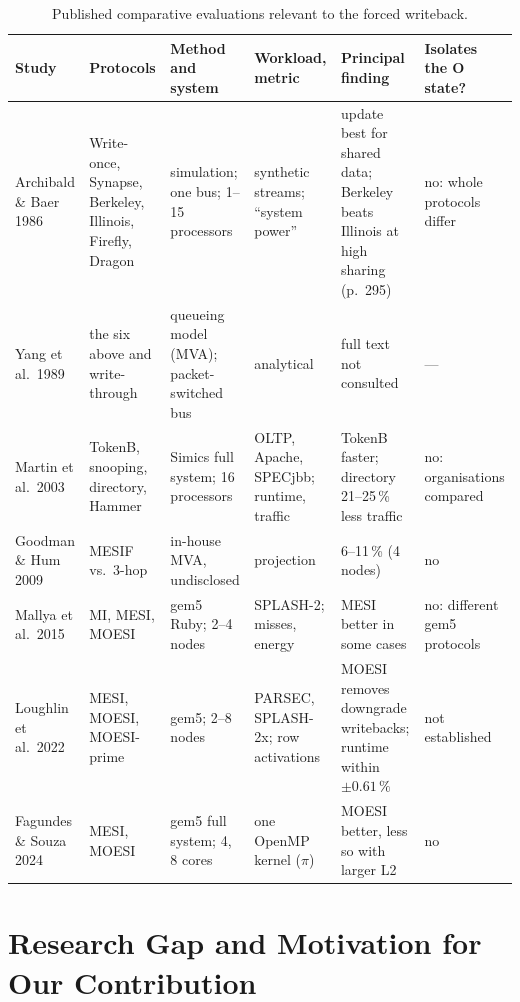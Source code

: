 \begin{table}[htbp]
\centering
\caption{Published comparative evaluations relevant to the forced writeback.}
\label{tab:evaluations}
\scriptsize
\begin{tabular}{@{}L{1.75cm} L{2.0cm} L{2.0cm} L{2.15cm} L{2.6cm} L{2.0cm}@{}}
\toprule
Study & Protocols & Method and system & Workload, metric & Principal finding &
  Isolates the O state? \\
\midrule
Archibald {\&} Baer 1986~\cite{archibald1986evaluation} & Write-once, Synapse,
  Berkeley, Illinois, Firefly, Dragon & simulation; one bus; 1--15 processors &
  synthetic streams; ``system power'' & update best for shared data; Berkeley
  beats Illinois at high sharing (p.~295) & no: whole protocols differ \\
Yang et al.\ 1989~\cite{yang1989analysis} & the six above and write-through &
  queueing model (MVA); packet-switched bus & analytical & full text not
  consulted & --- \\
Martin et al.\ 2003~\cite{martin2003token} & TokenB, snooping, directory,
  Hammer & Simics full system; 16 processors & OLTP, Apache, SPECjbb; runtime,
  traffic & TokenB faster; directory 21--25\,\% less traffic & no: organisations
  compared \\
Goodman {\&} Hum 2009~\cite{goodman2009mesif} & MESIF vs.\ 3-hop & in-house MVA,
  undisclosed & projection & 6--11\,\% (4 nodes) & no \\
Mallya et al.\ 2015~\cite{mallya2015simulation} & MI, MESI, MOESI & gem5 Ruby;
  2--4 nodes & SPLASH-2; misses, energy & MESI better in some cases & no:
  different gem5 protocols \\
Loughlin et al.\ 2022~\cite{loughlin2022moesiprime} & MESI, MOESI, MOESI-prime &
  gem5; 2--8 nodes & PARSEC, SPLASH-2x; row activations & MOESI removes downgrade
  writebacks; runtime within $\pm0.61\,\%$ & not established \\
Fagundes {\&} Souza 2024~\cite{fagundes2024evaluation} & MESI, MOESI & gem5 full
  system; 4, 8 cores & one OpenMP kernel ($\pi$) & MOESI better, less so with
  larger L2 & no \\
\bottomrule
\end{tabular}
\end{table}

\section{Research Gap and Motivation for Our Contribution}
\label{sec:cmp-gap}
%

